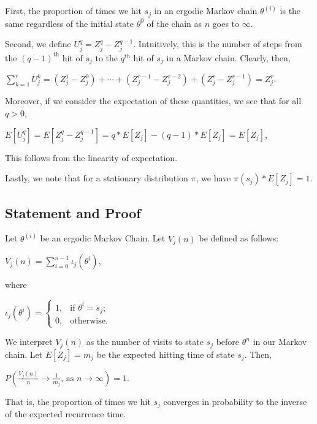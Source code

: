\documentclass[12pt,twoside]{reedthesis}
\begin{document}
		First, the proportion of times we hit $s_j$ in an ergodic Markov chain $\theta^{(i)}$ is the same regardless of the initial state $\theta^0$ of the chain as $n$ goes to $\infty$.
		
		Second, we define $U_{j}^q = Z_{j}^{q} - Z_{j}^{q-1}$. 
		Intuitively, this is the number of steps from the  $(q-1)^{\textrm{th}}$ hit of $s_j$ to the $q^{th}$ hit of $s_j$ in a Markov chain. 
		Clearly, then,
		\begin{center}
		 $\displaystyle\sum_{k=1}^{r}U_j^k 
		 = (Z_j^1 - Z_j^0) + \cdots + (Z_j^{r-1} - Z_j^{r-2}) + (Z_j^r - Z_j^{r-1}) 
		 = Z_j^r$. 
		 \end{center}
		 Moreover, if we consider the expectation of these quantities, we see that for all $q > 0$,
		\begin{center}
		$E[U_{j}^q] = E[Z_j^{q} - Z_j^{q-1}] = q*E[Z_j] - (q-1) *E[Z_j] = E[Z_j]$, 
		\end{center}
		This follows from the linearity of expectation.
		
		Lastly, we note that for a stationary distribution $\pi$, we have $\pi(s_j)*E[Z_j] = 1$.
		
		\subsection*{Statement and Proof}
		\begin{theorem}
		Let $\theta^{(i)}$ be an ergodic Markov Chain. 
		Let $V_j(n)$ be defined as follows:
		\begin{center}
			$V_j(n) = \displaystyle\sum_{i=0}^{n-1} \iota_j(\theta^{i})$,
		\end{center}
		where
		\begin{center}
			$\iota_j(\theta^i) = \begin{cases} 
				1, & \textrm{if\ \ \ } \theta^i = s_j; \\
				0, & \textrm{otherwise}. 
				\end{cases}
			$
		\end{center}
		We interpret $V_j(n)$ as the number of visits to state $s_j$ before $\theta^n$ in our Markov chain. 
		Let $E[Z_j] = m_j$ be the expected hitting time of state $s_j$. Then,
		\begin{center}
			$P\left(\displaystyle\frac{V_j(n)}{n} \longrightarrow \frac{1}{m_j}
			\textrm{, as } n \rightarrow \infty \right) = 1$.
		\end{center}
		
		That is, the proportion of times we hit $s_j$ converges in probability to the inverse of the expected recurrence time.
		\end{theorem}
		
\end{document}
